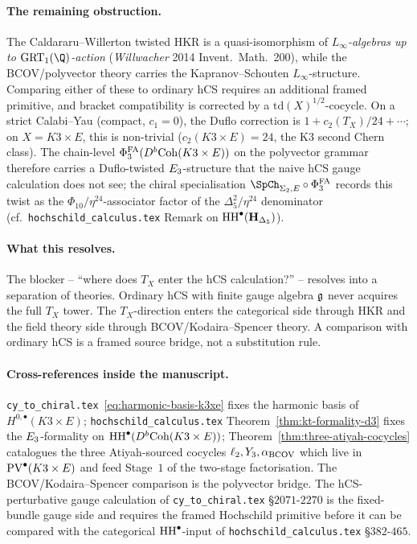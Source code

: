 \paragraph{The remaining obstruction.}
The Caldararu--Willerton twisted HKR is a quasi-isomorphism of
\emph{$L_\infty$-algebras up to $\mathrm{GRT}_1(\Q)$-action}
(\emph{Willwacher} 2014 Invent.\ Math.\ 200), while the
BCOV/polyvector theory carries the Kapranov--Schouten
$L_\infty$-structure. Comparing either of these to ordinary hCS
requires an additional framed primitive, and bracket compatibility is
corrected by a $\mathrm{td}(X)^{1/2}$-cocycle. On a strict
Calabi--Yau (compact, $c_1 = 0$), the Duflo correction is
$1 + c_2(T_X)/24 + \cdots$; on $X = K3\times E$, this is non-trivial
($c_2(K3\times E) = 24$, the K3 second Chern class). The chain-level
$\Phi^{\mathrm{FA}}_3(D^b\mathrm{Coh}(K3\times E))$ on the polyvector grammar therefore
carries a Duflo-twisted $E_3$-structure that the naive hCS gauge
calculation does not see; the chiral specialisation
$\SpCh_{\Sigma_2,E}\circ\PhiFA_3$ records this twist as the
$\Phi_{10}/\eta^{24}$-associator factor of the $\Delta_5^2/\eta^{24}$
denominator (cf.\ \texttt{hochschild\_calculus.tex}
Remark on $\mathrm{HH}^\bullet(\mathbf H_{\Delta_5})$).

\paragraph{What this resolves.}
The blocker -- ``where does $T_X$ enter the hCS calculation?'' --
resolves into a separation of theories. Ordinary hCS with finite
gauge algebra $\mathfrak{g}$ never acquires the full $T_X$ tower. The
$T_X$-direction enters the categorical side through HKR and the field
theory side through BCOV/Kodaira--Spencer theory. A comparison with
ordinary hCS is a framed source bridge, not a substitution rule.

\paragraph{Cross-references inside the manuscript.}
\texttt{cy\_to\_chiral.tex}~\eqref{eq:harmonic-basis-k3xe}
fixes the harmonic basis of $H^{0,\bullet}(K3\times E)$;
\texttt{hochschild\_calculus.tex}
Theorem~\ref{thm:kt-formality-d3} fixes the
$E_3$-formality on $\mathrm{HH}^\bullet(D^b\mathrm{Coh}(K3\times E))$;
Theorem~\ref{thm:three-atiyah-cocycles} catalogues the three
Atiyah-sourced cocycles $\ell_2, Y_3, \alpha_{\mathrm{BCOV}}$ which live in
$\mathrm{PV}^\bullet(K3\times E)$ and feed Stage~$1$ of the two-stage
factorisation. The BCOV/Kodaira--Spencer comparison is the polyvector
bridge. The hCS-perturbative gauge calculation of
\texttt{cy\_to\_chiral.tex} \S$2071$-$2270$ is the fixed-bundle gauge
side and requires the framed Hochschild primitive before it can be
compared with the categorical $\mathrm{HH}^\bullet$-input of
\texttt{hochschild\_calculus.tex} \S$382$-$465$.
